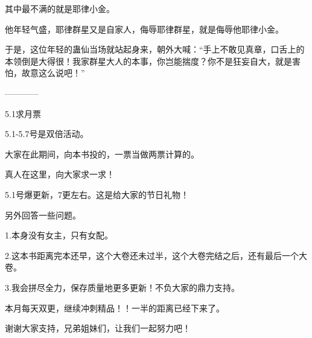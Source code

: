 \begin{this_body}
其中最不满的就是耶律小金。

他年轻气盛，耶律群星又是自家人，侮辱耶律群星，就是侮辱他耶律小金。

于是，这位年轻的蛊仙当场就站起身来，朝外大喊：“手上不敢见真章，口舌上的本领倒是大得很！我家群星大人的本事，你岂能揣度？你不是狂妄自大，就是害怕，故意这么说吧！”

------------

5.1求月票

5.1-5.7号是双倍活动。

大家在此期间，向本书投的，一票当做两票计算的。

真人在这里，向大家求一求！

5.1号爆更新，7更左右。这是给大家的节日礼物！

另外回答一些问题。

1.本身没有女主，只有女配。

2.这本书距离完本还早，这个大卷还未过半，这个大卷完结之后，还有最后一个大卷。

3.我会拼尽全力，保存质量地更多更新！不负大家的鼎力支持。

本月每天双更，继续冲刺精品！！一半的距离已经下来了。

谢谢大家支持，兄弟姐妹们，让我们一起努力吧！

\end{this_body}

